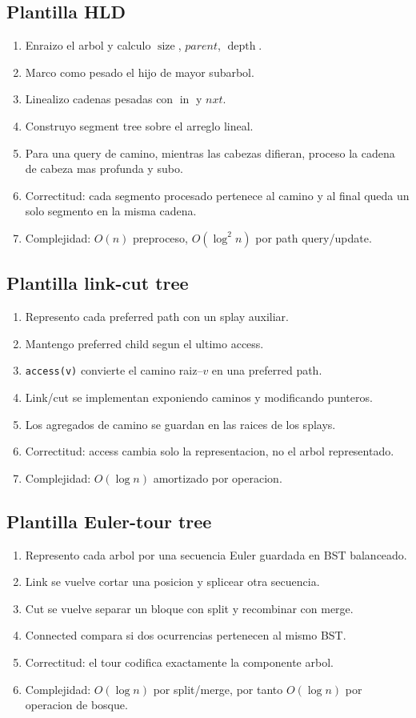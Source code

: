 \documentclass[10pt]{article}
\newcommand{\bigO}{O}
\newcommand{\depth}{\operatorname{depth}}
\newcommand{\size}{\operatorname{size}}
\newcommand{\tin}{\operatorname{in}}
\begin{document}
\subsection{Plantilla HLD}
\begin{enumerate}[leftmargin=*]
\item Enraizo el arbol y calculo $\size$, $parent$, $\depth$.
\item Marco como pesado el hijo de mayor subarbol.
\item Linealizo cadenas pesadas con $\tin$ y $nxt$.
\item Construyo segment tree sobre el arreglo lineal.
\item Para una query de camino, mientras las cabezas difieran, proceso la cadena
de cabeza mas profunda y subo.
\item Correctitud: cada segmento procesado pertenece al camino y al final queda
un solo segmento en la misma cadena.
\item Complejidad: $\bigO(n)$ preproceso, $\bigO(\log^2 n)$ por path query/update.
\end{enumerate}

\subsection{Plantilla link-cut tree}
\begin{enumerate}[leftmargin=*]
\item Represento cada preferred path con un splay auxiliar.
\item Mantengo preferred child segun el ultimo access.
\item \texttt{access(v)} convierte el camino raiz--$v$ en una preferred path.
\item Link/cut se implementan exponiendo caminos y modificando punteros.
\item Los agregados de camino se guardan en las raices de los splays.
\item Correctitud: access cambia solo la representacion, no el arbol representado.
\item Complejidad: $\bigO(\log n)$ amortizado por operacion.
\end{enumerate}

\subsection{Plantilla Euler-tour tree}
\begin{enumerate}[leftmargin=*]
\item Represento cada arbol por una secuencia Euler guardada en BST balanceado.
\item Link se vuelve cortar una posicion y splicear otra secuencia.
\item Cut se vuelve separar un bloque con split y recombinar con merge.
\item Connected compara si dos ocurrencias pertenecen al mismo BST.
\item Correctitud: el tour codifica exactamente la componente arbol.
\item Complejidad: $\bigO(\log n)$ por split/merge, por tanto $\bigO(\log n)$
por operacion de bosque.
\end{enumerate}
\end{document}
